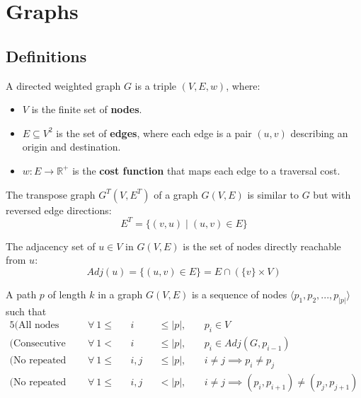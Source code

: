 \section{Graphs} \label{graphs}
\subsection{Definitions}
\begin{definition}
    A directed weighted graph $G$ is a triple $(V, E, w)$, where:
    \begin{itemize}
        \item $V$ is the finite set of \textbf{nodes}.
        \item $E \subseteq V^2$ is the set of \textbf{edges}, where each edge is a pair $(u,v)$ describing an origin and destination.
        \item $w: E \rightarrow \mathbb{R}^+$ is the \textbf{cost function} that maps each edge to a traversal cost.
    \end{itemize}
\end{definition}
\begin{definition}
    The transpose graph $G^T(V, E^T)$ of a graph $G(V, E)$ is similar to $G$ but with reversed edge directions:
    \begin{equation*}
        E^T = \{(v,u) \mid (u,v) \in E\}
    \end{equation*}
\end{definition}
\begin{definition}
    The adjacency set of $u \in V$ in $G(V,E)$ is the set of nodes directly reachable from $u$:
    \begin{equation*}
        Adj(u) = \{(u, v) \in E\} = E \cap (\{v\}\times V)
    \end{equation*}
\end{definition}
\begin{definition}[Path]
    A path $p$ of length $k$ in a graph $G(V,E)$ is a sequence of nodes $\langle p_1,p_2,...,p_{|p|}\rangle$ such that
    \begin{alignat*}{5}
        \text{(All nodes belong to the graph)}       ~~&\forall~1 \leq &&i   &&\leq |p|,&&~p_i \in V \\
        \text{(Consecutive nodes are adjacent)}      ~~&\forall~1 <    &&i   &&\leq |p|,&&~p_i \in Adj(G, p_{i-1})\\
        \text{(No repeated nodes)}                   ~~&\forall~1 \leq &&i,j &&\leq |p|,&&~i\neq j \implies p_i \neq p_j \\
        \text{(No repeated edges)}                   ~~&\forall~1 \leq &&i,j &&<    |p|,&&~i\neq j \implies (p_i,p_{i+1}) \neq (p_j, p_{j+1})
    \end{alignat*}
\end{definition}
